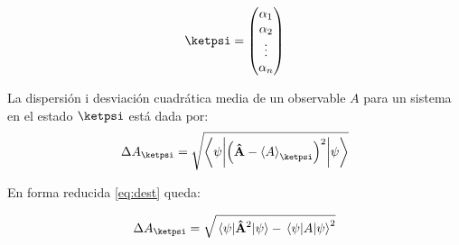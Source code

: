          $$
             \ketpsi=\mqty(\alpha_1\\\alpha_2\\\vdots\\\alpha_n)
         $$

         \begin{definition}
             La dispersión i desviación cuadrática media de un observable $A$ para un sistema en el estado $\ketpsi$ está dada por:
             \begin{equation}
                 \Delta A_{\ketpsi}=\sqrt{
                     \expval**{ \qty(\vu{A}-\expval{A}_{\ketpsi})^2}{\psi}
                 }
                 \label{eq:dest}
             \end{equation}
         \end{definition}

         En forma reducida \autoref{eq:dest} queda:

         \begin{equation}
             \Delta A_{\ketpsi}=\sqrt{\expval{\vu{A}^2}{\psi}-\expval{A}{\psi}^2}
             \label{eq:dest2}
         \end{equation}